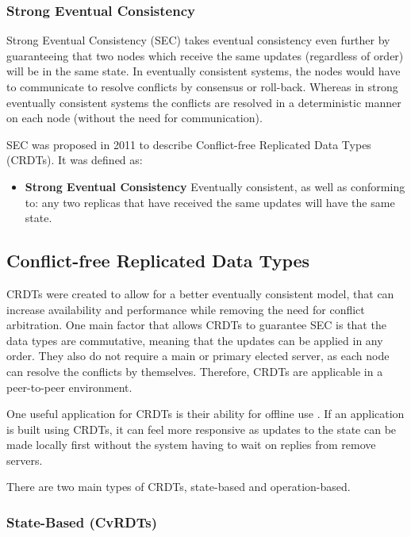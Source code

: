 \documentclass[12pt]{article}
\begin{document}
\subsubsection{Strong Eventual Consistency}
Strong Eventual Consistency (SEC) takes eventual consistency even further by guaranteeing that two nodes which receive the same updates (regardless of order) will be in the same state. In eventually consistent systems, the nodes would have to communicate to resolve conflicts by consensus or roll-back. Whereas in strong eventually consistent systems the conflicts are resolved in a deterministic manner on each node (without the need for communication). \par
SEC was proposed in 2011\cite{10.1007/978-3-642-24550-3_29} to describe Conflict-free Replicated Data Types (CRDTs). It was defined as:
\begin{itemize}
    \item \textbf{Strong Eventual Consistency} Eventually consistent, as well as conforming to: any two replicas that have received the same updates will have the same state.
\end{itemize}

\subsection{Conflict-free Replicated Data Types}
CRDTs were created to allow for a better eventually consistent model, that can increase availability and performance while removing the need for conflict arbitration.  One main factor that allows CRDTs to guarantee SEC is that the data types are commutative\cite{10.1007/978-3-642-24550-3_29}, meaning that the updates can be applied in any order. They also do not require a main or primary elected server, as each node can resolve the conflicts by themselves. Therefore, CRDTs are applicable in a peer-to-peer environment. \par
One useful application for CRDTs is their ability for offline use \cite{10.1145/3359591.3359737}. If an application is built using CRDTs, it can feel more responsive as updates to the state can be made locally first without the system having to wait on replies from remove servers. \par
There are two main types of CRDTs, state-based and operation-based.


\subsubsection{State-Based (CvRDTs)}
\end{document}
